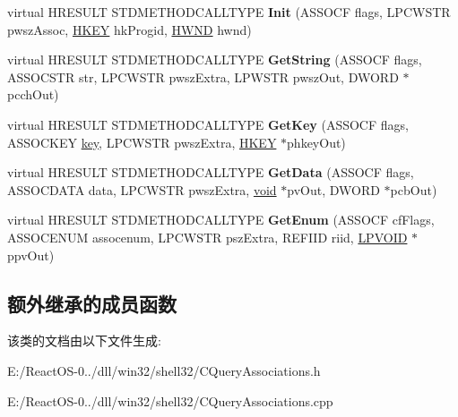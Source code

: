 \begin{DoxyCompactItemize}
\item 
\mbox{\label{class_c_query_associations_a0ac1b696f252e7c52ead0696476a9ddf}} 
virtual H\+R\+E\+S\+U\+LT S\+T\+D\+M\+E\+T\+H\+O\+D\+C\+A\+L\+L\+T\+Y\+PE {\bfseries Init} (A\+S\+S\+O\+CF flags, L\+P\+C\+W\+S\+TR pwsz\+Assoc, \hyperlink{interfacevoid}{H\+K\+EY} hk\+Progid, \hyperlink{interfacevoid}{H\+W\+ND} hwnd)
\item 
\mbox{\label{class_c_query_associations_abc0379c8a05711c414153c0c384e82b7}} 
virtual H\+R\+E\+S\+U\+LT S\+T\+D\+M\+E\+T\+H\+O\+D\+C\+A\+L\+L\+T\+Y\+PE {\bfseries Get\+String} (A\+S\+S\+O\+CF flags, A\+S\+S\+O\+C\+S\+TR str, L\+P\+C\+W\+S\+TR pwsz\+Extra, L\+P\+W\+S\+TR pwsz\+Out, D\+W\+O\+RD $\ast$pcch\+Out)
\item 
\mbox{\label{class_c_query_associations_ab8e15b247db54194ed83a2ebdba688a8}} 
virtual H\+R\+E\+S\+U\+LT S\+T\+D\+M\+E\+T\+H\+O\+D\+C\+A\+L\+L\+T\+Y\+PE {\bfseries Get\+Key} (A\+S\+S\+O\+CF flags, A\+S\+S\+O\+C\+K\+EY \hyperlink{structkey}{key}, L\+P\+C\+W\+S\+TR pwsz\+Extra, \hyperlink{interfacevoid}{H\+K\+EY} $\ast$phkey\+Out)
\item 
\mbox{\label{class_c_query_associations_ac0a4340ab9915e146319e4d0f980f7ce}} 
virtual H\+R\+E\+S\+U\+LT S\+T\+D\+M\+E\+T\+H\+O\+D\+C\+A\+L\+L\+T\+Y\+PE {\bfseries Get\+Data} (A\+S\+S\+O\+CF flags, A\+S\+S\+O\+C\+D\+A\+TA data, L\+P\+C\+W\+S\+TR pwsz\+Extra, \hyperlink{interfacevoid}{void} $\ast$pv\+Out, D\+W\+O\+RD $\ast$pcb\+Out)
\item 
\mbox{\label{class_c_query_associations_a944d63791c62331c1adfa95e8d0de93f}} 
virtual H\+R\+E\+S\+U\+LT S\+T\+D\+M\+E\+T\+H\+O\+D\+C\+A\+L\+L\+T\+Y\+PE {\bfseries Get\+Enum} (A\+S\+S\+O\+CF cf\+Flags, A\+S\+S\+O\+C\+E\+N\+UM assocenum, L\+P\+C\+W\+S\+TR psz\+Extra, R\+E\+F\+I\+ID riid, \hyperlink{interfacevoid}{L\+P\+V\+O\+ID} $\ast$ppv\+Out)
\end{DoxyCompactItemize}
\subsection*{额外继承的成员函数}


该类的文档由以下文件生成\+:\begin{DoxyCompactItemize}
\item 
E\+:/\+React\+O\+S-\/0../dll/win32/shell32/C\+Query\+Associations.\+h\item 
E\+:/\+React\+O\+S-\/0../dll/win32/shell32/C\+Query\+Associations.\+cpp\end{DoxyCompactItemize}
